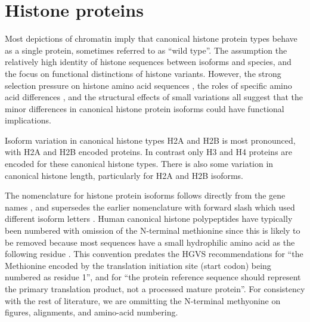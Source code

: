 \section{Histone proteins}
  Most depictions of chromatin imply that
  canonical histone protein types behave as a single protein,
  sometimes referred to as ``wild type''.
  The assumption the relatively high identity of histone sequences between isoforms and species,
  and the focus on functional distinctions of histone variants.
  However, the strong selection pressure on histone amino acid sequences \citep{birth-death-review},
  the roles of specific amino acid differences \citep{MazeAllis2014},
  and the structural effects of small variations \citep{KurumizakaCOSB2013}
  all suggest that the minor differences in canonical histone protein isoforms
  could have functional implications.

  Isoform variation in canonical histone types H2A and H2B is most pronounced,
  with \HTwoAUniqueProteins{} H2A and \HTwoBUniqueProteins{} H2B encoded proteins.
  In contrast only \HThreeUniqueProteins{} H3 and \HFourUniqueProteins{} H4 proteins
  are encoded for these canonical histone types.
  There is also some variation in canonical histone length, particularly for H2A and H2B isoforms.

  The nomenclature for histone protein isoforms follows directly from the gene names \citep{Marzluff02},
  and supersedes the earlier nomenclature with forward slash which used different isoform letters
  \citep{AlbigGenomics1997,AlbigHumangen1997}.
  Human canonical histone polypeptides have typically been numbered
  with omission of the N-terminal methionine
  since this is likely to be removed because most sequences have
  a small hydrophilic amino acid as the following residue \citep{XiaoPeiBiochem2010}.
  This convention predates the HGVS recommendations for ``the Methionine encoded
  by the translation initiation site (start codon) being numbered as residue 1'',
  and for ``the protein reference sequence should represent the primary
  translation product, not a processed mature protein''.  For consistency
  with the rest of literature, we are ommitting the N-terminal methyonine
  on figures, alignments, and amino-acid numbering.

